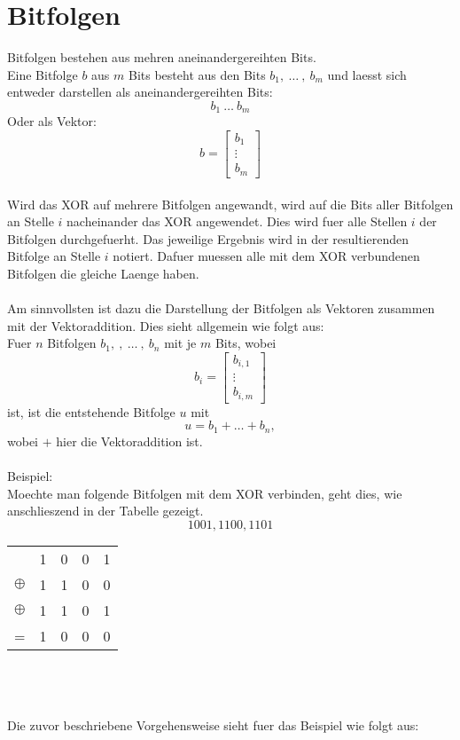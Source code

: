 \documentclass[a4paper,10pt,ngerman]{scrartcl}
\begin{document}
\section{Bitfolgen}
Bitfolgen bestehen aus mehren aneinandergereihten Bits.\\
Eine Bitfolge $b$ aus $m$ Bits besteht aus den Bits $b_1, \ \dots \ , \ b_m$ und laesst sich entweder darstellen als aneinandergereihten Bits:
$$
b_1 \ \dots \ b_m
$$
Oder als Vektor:
$$
b = \begin{bmatrix}
           b_1 \\
           \vdots \\
           b_m
         \end{bmatrix} 
$$
\\
Wird das XOR auf mehrere Bitfolgen angewandt, wird auf die Bits aller Bitfolgen an Stelle $i$ nacheinander das XOR angewendet. Dies wird fuer alle Stellen $i$ der Bitfolgen durchgefuerht. Das jeweilige Ergebnis wird in der resultierenden Bitfolge an Stelle $i$ notiert.
Dafuer muessen alle mit dem XOR verbundenen Bitfolgen die gleiche Laenge haben.\\
\\
Am sinnvollsten ist dazu die Darstellung der Bitfolgen als Vektoren zusammen mit der Vektoraddition.
Dies sieht allgemein wie folgt aus:\\
Fuer \(n\) Bitfolgen $b_1, \ , \ \dots \ , \ b_n$ mit je \(m\) Bits, wobei 
$$
b_i = \begin{bmatrix}
           b_{i, 1} \\
           \vdots \\
           b_{i, m}
         \end{bmatrix}
$$
ist, ist die entstehende Bitfolge $u$ mit
$$
u = b_1 + \dots + b_n,
$$
wobei $+$ hier die Vektoraddition ist.
\\\\
Beispiel:\\
Moechte man folgende Bitfolgen mit dem XOR verbinden, geht dies, wie anschlieszend in der Tabelle gezeigt.
\[1001, 1100, 1101\]
\begin{tabular}[c]{ c | c | c | c | c }			
   & 1 & 0 & 0 & 1 \\
  \(\oplus\) & 1 & 1 & 0 & 0 \\
  \(\oplus\) & 1 & 1 & 0 & 1 \\
	\hline
	= & 1 & 0 & 0 & 0 \\ 
\end{tabular}   
\\\\\\Die zuvor beschriebene Vorgehensweise sieht fuer das Beispiel wie folgt aus:
\end{document}

